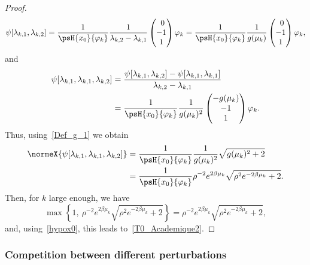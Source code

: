 \begin{proof}
\begin{equation*}
\psi[\lambda_{k,1}, \lambda_{k,2}] = \frac{1}{\psH{x_0}{\varphi_k}} \frac{1}{\lambda_{k,2}-\lambda_{k,1}}
\begin{pmatrix} \ 0\\-1\\1
\end{pmatrix} \varphi_k
= \frac{1}{\psH{x_0}{\varphi_k}} \frac{1}{g(\mu_k)}
\begin{pmatrix} \ 0\\-1\\1
\end{pmatrix} \varphi_k,
\end{equation*}
and
\begin{align*}
\psi[\lambda_{k,1},\lambda_{k,1},\lambda_{k,2}] &= \frac{\psi[\lambda_{k,1},\lambda_{k,2}]-\psi[\lambda_{k,1},\lambda_{k,1}]}{\lambda_{k,2}-\lambda_{k,1}}
\\
&= \frac{1}{\psH{x_0}{\varphi_k}} \frac{1}{g(\mu_k)^2 }
\begin{pmatrix} -g(\mu_k) \\ -1 \\ 1
\end{pmatrix} \varphi_k.
\end{align*}
Thus, using~\eqref{Def_g_1} we obtain
\begin{align*}
\normeX{ \psi[\lambda_{k,1}, \lambda_{k,1}, \lambda_{k,2}] } &= \frac{1}{\psH{x_0}{\varphi_k}} \frac{1}{g(\mu_k)^2 } \sqrt{g(\mu_k)^2+2}
\\
&= \frac{1}{\psH{x_0}{\varphi_k}} \rho^{-2} e^{2\beta \mu_k} \sqrt{\rho^2 e^{-2\beta \mu_k}+2}.
\end{align*}
Then, for $k$ large enough, we have
\[
\max \left\{ 1, \: \rho^{-2}e^{2\beta \mu_k} \sqrt{\rho^2 e^{-2\beta \mu_k}+2} \right\} = \rho^{-2} e^{2\beta \mu_k} \sqrt{\rho^2 e^{-2\beta \mu_k}+2},
\]
and, using~\eqref{hypox0}, this leads to~\eqref{T0_Academique2}.
\end{proof}



\subsubsection{Competition between different perturbations}\label{secexample3x3}


